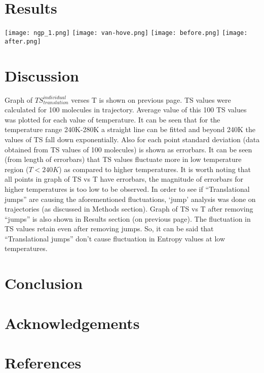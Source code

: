 \documentclass{article}[a4paper,12pt,twoside]
\begin{document}
\section{Results}
\texttt{[image: ngp\_1.png]}
\cleardoublepage
\texttt{[image: van-hove.png]}
\cleardoublepage
\texttt{[image: before.png]}
\texttt{[image: after.png]}
\cleardoublepage

\section{Discussion}
Graph of $ TS^{individual}_{translation} $ verses T is shown on previous page. TS values were calculated for 100 molecules in trajectory. Average value of this 100 TS values 
was plotted for each value of temperature. It can be seen that for the temperature range 240K-280K a straight line can be fitted and beyond 240K the values of TS fall down 
exponentially. Also for each point standard deviation (data obtained from TS values of 100 molecules) is shown as errorbars. It can be seen (from length of errorbars) that 
TS values fluctuate more in low temperature region ($T<240K$) as compared to higher temperatures. It is worth noting that all points in graph of TS vs T have errorbars, the
magnitude of errorbars for higher temperatures is too low to be observed. In order to see if ``Translational jumps'' are causing the aforementioned fluctuations, `jump' analysis
was done on trajectories (as discussed in Methods section). Graph of TS vs T after removing ``jumps'' is also shown in Results section (on previous page). The fluctuation in
TS values retain even after removing jumps. So, it can be said that ``Translational jumps'' don't cause fluctuation in Entropy values at low temperatures.

\section{Conclusion}
\section{Acknowledgements}
\section{References}
\end{document}
